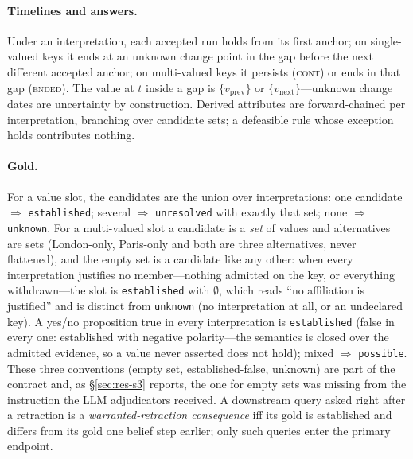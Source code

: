 \paragraph{Timelines and answers.} Under an interpretation, each accepted run holds from its first anchor; on single-valued keys it ends at an unknown change point in the gap before the next different accepted anchor; on multi-valued keys it persists (\textsc{cont}) or ends in that gap (\textsc{ended}). The value at $t$ inside a gap is $\{v_{\mathrm{prev}}\}$ or $\{v_{\mathrm{next}}\}$---unknown change dates are uncertainty by construction. Derived attributes are forward-chained per interpretation, branching over candidate sets; a defeasible rule whose exception holds contributes nothing.

\paragraph{Gold.} For a value slot, the candidates are the union over interpretations: one candidate $\Rightarrow$ \texttt{established}; several $\Rightarrow$ \texttt{unresolved} with exactly that set; none $\Rightarrow$ \texttt{unknown}. For a multi-valued slot a candidate is a \emph{set} of values and alternatives are sets (London-only, Paris-only and both are three alternatives, never flattened), and the empty set is a candidate like any other: when every interpretation justifies no member---nothing admitted on the key, or everything withdrawn---the slot is \texttt{established} with $\emptyset$, which reads ``no affiliation is justified'' and is distinct from \texttt{unknown} (no interpretation at all, or an undeclared key). A yes/no proposition true in every interpretation is \texttt{established} (false in every one: established with negative polarity---the semantics is closed over the admitted evidence, so a value never asserted does not hold); mixed $\Rightarrow$ \texttt{possible}. These three conventions (empty set, established-false, unknown) are part of the contract and, as \S\ref{sec:res-s3} reports, the one for empty sets was missing from the instruction the LLM adjudicators received. A downstream query asked right after a retraction is a \emph{warranted-retraction consequence} iff its gold is established and differs from its gold one belief step earlier; only such queries enter the primary endpoint.

